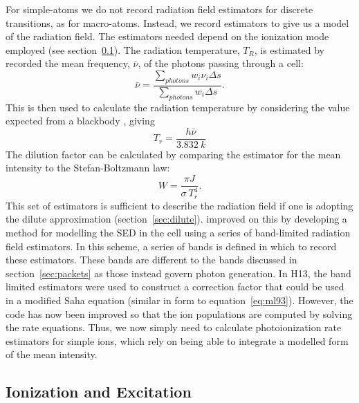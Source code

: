 For simple-atoms we do not record radiation field estimators for discrete 
transitions, as for macro-atoms. Instead, we record estimators to
give us a model of the radiation field. The estimators needed
depend on the ionization mode employed (see section~\ref{sec:simple_ionization}).
The radiation temperature, $T_R$, is estimated by recorded the mean frequency, 
$\bar{\nu}$, of the photons passing through a cell:
\begin{equation}
\bar{\nu} = \frac{\sum_{photons} w_i \nu_i \Delta s}{\sum_{photons} w_i \Delta s}.
\end{equation}
This is then used to calculate the radiation temperature by
considering the value expected from a blackbody \cite{ML93}, giving 
\begin{equation}
T_r = \frac{h\bar{\nu}}{3.832~k}
\end{equation}
The dilution factor can be calculated by comparing the estimator for the mean intensity 
to the Stefan-Boltzmann law:
\begin{equation}
W = \frac{\pi J}{\sigma~T_r^4}.
\end{equation}
This set of estimators is sufficient to describe the 
radiation field if one is adopting the dilute approximation (section~\ref{sec:dilute}).
\cite{higginbottom2013} improved on this by developing a method for
modelling the SED in the cell using a series of band-limited 
radiation field estimators. In this scheme, a series of bands is defined
in which to record these estimators. These bands are different to the bands
discussed in section~\ref{sec:packets} as those instead govern photon generation.
In H13, the band limited estimators were used to construct a correction factor
that could be used in a modified Saha equation 
(similar in form to equation~\ref{eq:ml93}). However, the code has now been
improved so that the ion populations are computed by solving the rate equations.
Thus, we now simply need to calculate photoionization rate estimators for simple 
ions, which rely on being able to integrate a modelled form of the mean intensity.



\subsection{Ionization and Excitation}
\label{sec:simple_ionization}



